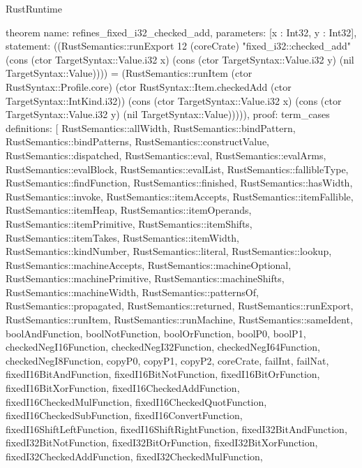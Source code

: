 \begin{lexlean}{RustRuntime}
\begin{semanticmodule}
theorem{
  name: refines_fixed_i32_checked_add,
  parameters: [x : Int32, y : Int32],
  statement: ((RustSemantics::runExport 12 (coreCrate) "fixed_i32::checked_add" (cons (ctor TargetSyntax::Value.i32 x) (cons (ctor TargetSyntax::Value.i32 y) (nil TargetSyntax::Value)))) = (RustSemantics::runItem (ctor RustSyntax::Profile.core) (ctor RustSyntax::Item.checkedAdd (ctor TargetSyntax::IntKind.i32)) (cons (ctor TargetSyntax::Value.i32 x) (cons (ctor TargetSyntax::Value.i32 y) (nil TargetSyntax::Value))))),
  proof: term_cases{
    definitions: [
      RustSemantics::allWidth,
      RustSemantics::bindPattern,
      RustSemantics::bindPatterns,
      RustSemantics::constructValue,
      RustSemantics::dispatched,
      RustSemantics::eval,
      RustSemantics::evalArms,
      RustSemantics::evalBlock,
      RustSemantics::evalList,
      RustSemantics::fallibleType,
      RustSemantics::findFunction,
      RustSemantics::finished,
      RustSemantics::hasWidth,
      RustSemantics::invoke,
      RustSemantics::itemAccepts,
      RustSemantics::itemFallible,
      RustSemantics::itemHeap,
      RustSemantics::itemOperands,
      RustSemantics::itemPrimitive,
      RustSemantics::itemShifts,
      RustSemantics::itemTakes,
      RustSemantics::itemWidth,
      RustSemantics::kindNumber,
      RustSemantics::literal,
      RustSemantics::lookup,
      RustSemantics::machineAccepts,
      RustSemantics::machineOptional,
      RustSemantics::machinePrimitive,
      RustSemantics::machineShifts,
      RustSemantics::machineWidth,
      RustSemantics::patternsOf,
      RustSemantics::propagated,
      RustSemantics::returned,
      RustSemantics::runExport,
      RustSemantics::runItem,
      RustSemantics::runMachine,
      RustSemantics::sameIdent,
      boolAndFunction,
      boolNotFunction,
      boolOrFunction,
      boolP0,
      boolP1,
      checkedNegI16Function,
      checkedNegI32Function,
      checkedNegI64Function,
      checkedNegI8Function,
      copyP0,
      copyP1,
      copyP2,
      coreCrate,
      failInt,
      failNat,
      fixedI16BitAndFunction,
      fixedI16BitNotFunction,
      fixedI16BitOrFunction,
      fixedI16BitXorFunction,
      fixedI16CheckedAddFunction,
      fixedI16CheckedMulFunction,
      fixedI16CheckedQuotFunction,
      fixedI16CheckedSubFunction,
      fixedI16ConvertFunction,
      fixedI16ShiftLeftFunction,
      fixedI16ShiftRightFunction,
      fixedI32BitAndFunction,
      fixedI32BitNotFunction,
      fixedI32BitOrFunction,
      fixedI32BitXorFunction,
      fixedI32CheckedAddFunction,
      fixedI32CheckedMulFunction,
}}
\end{semanticmodule}
\end{lexlean}
